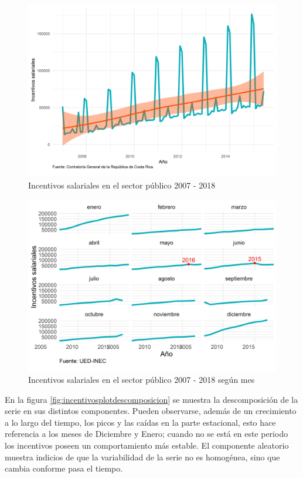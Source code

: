 \documentclass[
]{article}
\begin{document}
\begin{figure}[!h]
\includegraphics[width=1\linewidth,height=1\textheight]{Tesis_files/figure-latex/incentivosplotgeneral-1} \caption{Incentivos salariales en el sector público 2007 - 2018}\label{fig:incentivosplotgeneral}
\end{figure}

\begin{figure}[!h]
\includegraphics[width=1\linewidth,height=1\textheight]{Tesis_files/figure-latex/incentivosplotperiodos-1} \caption{Incentivos salariales en el sector público 2007 - 2018 según mes}\label{fig:incentivosplotperiodos}
\end{figure}

En la figura \ref{fig:incentivosplotdescomposicion} se muestra la
descomposición de la serie en sus distintos componentes. Pueden
observarse, además de un crecimiento a lo largo del tiempo, los picos y
las caídas en la parte estacional, esto hace referencia a los meses de
Diciembre y Enero; cuando no se está en este periodo los incentivos
poseen un comportamiento más estable. El componente aleatorio muestra
indicios de que la variabilidad de la serie no es homogénea, sino que
cambia conforme pasa el tiempo.
\end{document}
